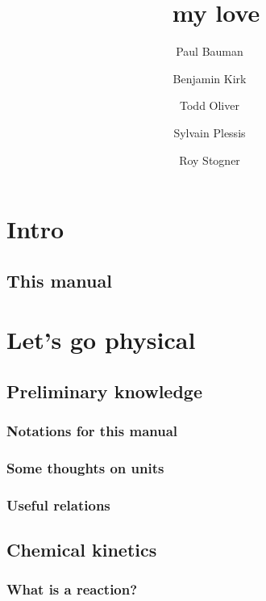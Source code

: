 \documentclass[twoside]{report}
\begin{document}
\title{\Antioch\ my love}
\date{\theversion}
\author{Paul Bauman \and Benjamin Kirk \and Todd Oliver \and Sylvain Plessis \and Roy Stogner}

\maketitle
\tableofcontents

\chapter{Intro}

\section{This manual}


\chapter{Let's go physical}
\chaptermark{\ANTIOCHPhys}
\label{Antioch:physics}

\section{Preliminary knowledge}

\subsection{Notations for this manual}


\subsection{Some thoughts on units}
\label{units_in_Antioch}


\subsection{Useful relations}
\label{relations}


\section{Chemical kinetics}

\subsection{What is a reaction?}
\label{kinetics_gen}

\end{document}
